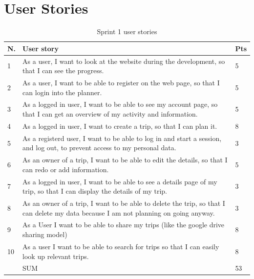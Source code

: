 \documentclass[a4paper]{article}
\begin{document}


\appendix

\section{User Stories}
\label{sec:user-stories}

\begin{table}[!h]
  \begin{tabulary}{1.0\textwidth}{|L|L|L|}
    \hline
    N. & User story & Pts \\ \hline
    
    1&As a user, I want to look at the website during the development, so that I can see the progress.
    & 5 \\ \hline
    
    2&As a user, I want to be able to register on the web page, so that I can login into the planner.
    & 5 \\ \hline

    3&As a logged in user, I want to be able to see my account page, so that I can get an overview of my activity and information.
    & 5 \\ \hline

    4&As a logged in user, I want to create a trip, so that I can plan it. 
    & 8 \\ \hline

    5&As a registerd user, I want to be able to log in and start a session, and log out, to prevent access to my personal data. & 3 \\ \hline

    6&As an owner of a trip, I want to be able to edit the details, so that I can redo or add information. & 5 \\ \hline

    7&As a logged in user, I want to be able to see a details page of my trip, so that I can display the details of my trip. & 3 \\ \hline

    8&As an owner of a trip, I want to be able to delete the trip, so that I can delete my data because I am not planning on going anyway. & 3 \\ \hline

    9&As a User I want to be able to share my trips (like the google drive sharing model) & 8 \\ \hline

    10&As a user I want to be able to search for trips so that I can easily look up relevant trips. & 8 \\ \hline
    &SUM & 53 \\ \hline
  \end{tabulary}
  \caption{Sprint 1 user stories}
\end{table}
\end{document}
